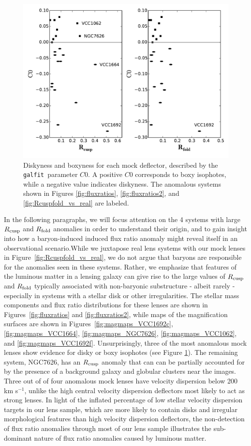 \begin{figure}
	\includegraphics[trim=0cm 0cm 0cm .4cm,clip,width=.48\textwidth]{./figures_sls/C0_vs_Rcuspfold_truth-eps-converted-to.pdf}
	\caption{\label{fig:C0_vs_Rcuspfold} Diskyness and boxyness for each mock deflector, described by the {\tt {galfit} }parameter $C0$. A positive $C0$ corresponds to boxy isophotes, while a negative value indicates diskyness. The anomalous systems shown in Figures \ref{fig:fluxratios}, \ref{fig:fluxratios2}, and \ref{fig:Rcuspfold_vs_real} are labeled.}
\end{figure}
In the following paragraphs, we will focus attention on the 4 systems with large $R_{\rm{cusp}}$ and $R_{\rm{fold}}$ anomalies in order to understand their origin, and to gain insight into how a baryon-induced induced flux ratio anomaly might reveal itself in an observational scenario.While we juxtapose real lens systems with our mock lenses in Figure~\ref{fig:Rcuspfold_vs_real}, we do not argue that baryons are responsible for the anomalies seen in these systems. Rather, we emphasize that features of the luminous matter in a lensing galaxy can give rise to the large values of $R_{\rm{cusp}}$ and $R_{\rm{fold}}$ typically associated with non-baryonic substructure - albeit rarely - especially in systems with a stellar disk or other irregularities. The stellar mass components and flux ratio distributions for these lenses are shown in Figures~\ref{fig:fluxratios} and \ref{fig:fluxratios2}, while maps of the magnification surfaces are shown in Figures~\ref{fig:magmaps_VCC1692c}, \ref{fig:magmaps_VCC1664}, \ref{fig:magmaps_NGC7626}, \ref{fig:magmaps_VCC1062}, and \ref{fig:magmaps_VCC1692f}.
Unsurprisingly, three of the most anomalous mock lenses show evidence for disky or boxy isophotes (see Figure \ref{fig:C0_vs_Rcuspfold}). The remaining system, NGC7626, has an $R_{\rm{cusp}}$ anomaly that can can be partially accounted for by the presence of a background galaxy and globular clusters near the images. Three out of of four anomalous mock lenses have velocity dispersion below 200 km s$^{-1}$, unlike the high central velocity dispersion deflectors most likely to act as strong lenses. In light of the inflated percentage of low stellar velocity dispersion targets in our lens sample, which are more likely to contain disks and irregular morphological features than high velocity dispersion deflectors, the non-detection of flux ratio anomalies through most of our lens sample illustrates the sub-dominant nature of flux ratio anomalies caused by luminous matter. 
